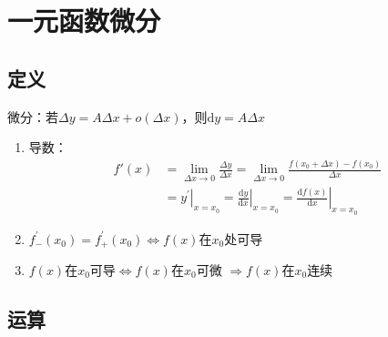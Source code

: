 \documentclass[12pt]{book}
\begin{document}
\section{一元函数微分}



\subsection{定义}

微分：若$\Delta y =A \Delta x +o(\Delta x) $，则$ \mathrm{d} y = A \Delta x $

\begin{enumerate}[1.]
    \item 导数：
          \begin{align*}
              f'(x) & = \lim_{\Delta x\rightarrow 0}{\frac{\Delta y}{\Delta x}} = \lim_{\Delta x\rightarrow 0}{\frac{f(x_0+\Delta x)-f(x_0)}{\Delta x}} \\
              & = \left.y^\prime \right|_{x=x_0}  
              =\left.\frac{\mathrm{d}y}{\mathrm{d}x} \right|_{x=x_0} = \left.\frac{\mathrm{d}f(x)}{\mathrm{d}x} \right|_{x=x_0}
          \end{align*}
    \item $f^\prime_{-}(x_0)=f^\prime_{+}(x_0)\Leftrightarrow f(x)$在$x_0$处可导
    \item $f(x)$在$x_0$可导$\Leftrightarrow f(x)$在$x_0$可微 $\Rightarrow f(x)$在$x_0$连续
\end{enumerate}


\subsection{运算}
\end{document}
